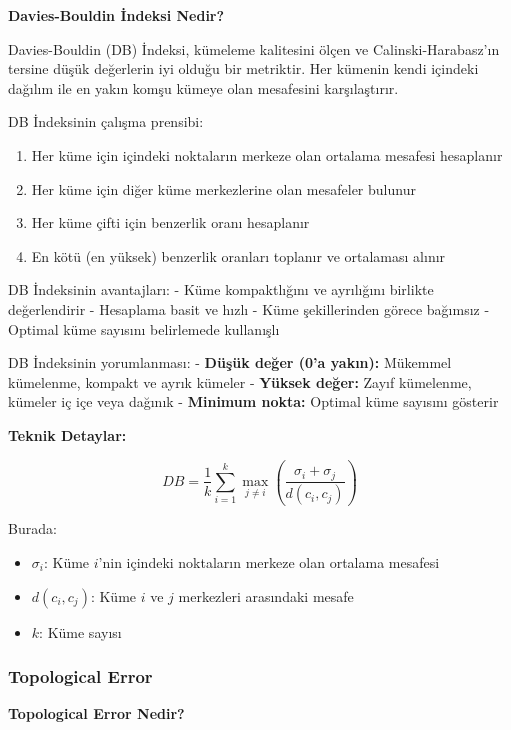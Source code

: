 \textbf{Davies-Bouldin İndeksi Nedir?}

Davies-Bouldin (DB) İndeksi, kümeleme kalitesini ölçen ve Calinski-Harabasz'ın tersine düşük değerlerin iyi olduğu bir metriktir. Her kümenin kendi içindeki dağılım ile en yakın komşu kümeye olan mesafesini karşılaştırır.

DB İndeksinin çalışma prensibi:
\begin{enumerate}
    \item Her küme için içindeki noktaların merkeze olan ortalama mesafesi hesaplanır
    \item Her küme için diğer küme merkezlerine olan mesafeler bulunur
    \item Her küme çifti için benzerlik oranı hesaplanır
    \item En kötü (en yüksek) benzerlik oranları toplanır ve ortalaması alınır
\end{enumerate}

DB İndeksinin avantajları:
- Küme kompaktlığını ve ayrılığını birlikte değerlendirir
- Hesaplama basit ve hızlı
- Küme şekillerinden görece bağımsız
- Optimal küme sayısını belirlemede kullanışlı

DB İndeksinin yorumlanması:
- \textbf{Düşük değer (0'a yakın):} Mükemmel kümelenme, kompakt ve ayrık kümeler
- \textbf{Yüksek değer:} Zayıf kümelenme, kümeler iç içe veya dağınık
- \textbf{Minimum nokta:} Optimal küme sayısını gösterir

\textbf{Teknik Detaylar:}

\begin{equation}
DB = \frac{1}{k} \sum_{i=1}^{k} \max_{j \neq i} \left( \frac{\sigma_i + \sigma_j}{d(c_i, c_j)} \right)
\label{eq:davies_bouldin}
\end{equation}

Burada:
\begin{itemize}
    \item $\sigma_i$: Küme $i$'nin içindeki noktaların merkeze olan ortalama mesafesi
    \item $d(c_i, c_j)$: Küme $i$ ve $j$ merkezleri arasındaki mesafe
    \item $k$: Küme sayısı
\end{itemize}

\newpage

\subsubsection{Topological Error}

\textbf{Topological Error Nedir?}

